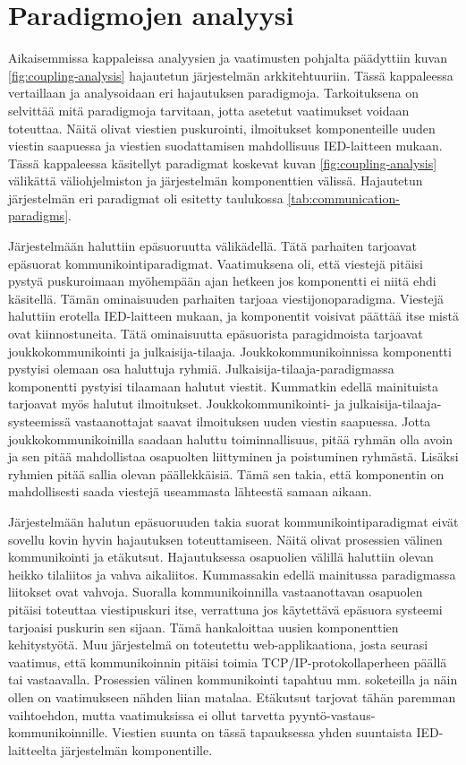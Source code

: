 \section{Paradigmojen analyysi}
Aikaisemmissa kappaleissa analyysien ja vaatimusten pohjalta päädyttiin kuvan \ref{fig:coupling-analysis} hajautetun järjestelmän arkkitehtuuriin. Tässä kappaleessa vertaillaan ja analysoidaan eri hajautuksen paradigmoja. Tarkoituksena on selvittää mitä paradigmoja tarvitaan, jotta asetetut vaatimukset voidaan toteuttaa. Näitä olivat viestien puskurointi, ilmoitukset komponenteille uuden viestin saapuessa ja viestien suodattamisen mahdollisuus IED-laitteen mukaan. Tässä kappaleessa käsitellyt paradigmat koskevat kuvan \ref{fig:coupling-analysis} välikättä väliohjelmiston ja järjestelmän komponenttien välissä. Hajautetun järjestelmän eri paradigmat oli esitetty taulukossa \ref{tab:communication-paradigms}.

Järjestelmään haluttiin epäsuoruutta välikädellä. Tätä parhaiten tarjoavat epäsuorat kommunikointiparadigmat. Vaatimuksena oli, että viestejä pitäisi pystyä puskuroimaan myöhempään ajan hetkeen jos komponentti ei niitä ehdi käsitellä. Tämän ominaisuuden parhaiten tarjoaa viestijonoparadigma. Viestejä haluttiin erotella IED-laitteen mukaan, ja komponentit voisivat päättää itse mistä ovat kiinnostuneita. Tätä ominaisuutta epäsuorista paragidmoista tarjoavat joukkokommunikointi ja julkaisija-tilaaja. Joukkokommunikoinnissa komponentti pystyisi olemaan osa haluttuja ryhmiä. Julkaisija-tilaaja-paradigmassa komponentti pystyisi tilaamaan halutut viestit. Kummatkin edellä mainituista tarjoavat myös halutut ilmoitukset. Joukkokommunikointi- ja julkaisija-tilaaja-systeemissä vastaanottajat saavat ilmoituksen uuden viestin saapuessa. Jotta joukkokommunikoinilla saadaan haluttu toiminnallisuus, pitää ryhmän olla avoin ja sen pitää mahdollistaa osapuolten liittyminen ja poistuminen ryhmästä. Lisäksi ryhmien pitää sallia olevan päällekkäisiä. Tämä sen takia, että komponentin on mahdollisesti saada viestejä useammasta lähteestä samaan aikaan.

Järjestelmään halutun epäsuoruuden takia suorat kommunikointiparadigmat eivät sovellu kovin hyvin hajautuksen toteuttamiseen. Näitä olivat prosessien välinen kommunikointi ja etäkutsut. Hajautuksessa osapuolien välillä haluttiin olevan heikko tilaliitos ja vahva aikaliitos. Kummassakin edellä mainitussa paradigmassa liitokset ovat vahvoja. Suoralla kommunikoinnilla vastaanottavan osapuolen pitäisi toteuttaa viestipuskuri itse, verrattuna jos käytettävä epäsuora systeemi tarjoaisi puskurin sen sijaan. Tämä hankaloittaa uusien komponenttien kehitystyötä. Muu järjestelmä on toteutettu web-applikaationa, josta seurasi vaatimus, että kommunikoinnin pitäisi toimia TCP/IP-protokollaperheen päällä tai vastaavalla. Prosessien välinen kommunikointi tapahtuu mm. soketeilla ja näin ollen on vaatimukseen nähden liian matalaa. Etäkutsut tarjovat tähän paremman vaihtoehdon, mutta vaatimuksissa ei ollut tarvetta pyyntö-vastaus-kommunikoinnille. Viestien suunta on tässä tapauksessa yhden suuntaista IED-laitteelta järjestelmän komponentille.

